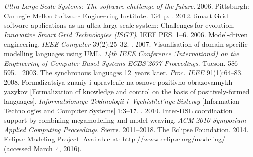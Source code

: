





  \begin{multicols}{2}

\renewcommand{\bibname}{\protect\rmfamily References}

{\small\frenchspacing
 {%
 \begin{thebibliography}{99}
 \textit{Ultra-Large-Scale Systems: The software challenge of the future}. 
 2006. Pittsburgh: 
Carnegie Mellon Software Engineering Institute. 134~p.
. 2012. Smart Grid software applications as an 
ultra-large-scale system: Challenges for evolution. \textit{Innovative Smart Grid Technologies 
(ISGT)}. IEEE PES.  1--6.
 2006.  Model-driven engineering. \textit{IEEE Computer} 39(2):25--32.
. 2007. Visualisation of domain-specific modelling languages 
using UML. \textit{14th IEEE  Conference (International) on the Engineering of Computer-Based 
Systems ECBS'2007 Proceedings}. Tucson. 586--595.
. 2003. The synchronous languages 12~years later. \textit{Proc. IEEE}  91(1):64--83.
 2008. Formalizatsiya znaniy i upravlenie na osnove pozitivno-obrazovannykh 
yazykov [Formalization of knowledge and control on the basis of positively-formed languages]. 
\textit{Informatsionnye Tekhnologii i~Vychislitel'nye Sistemy} [Information Technologies and 
Computer Systems] 1:3--17.
. 2010.  
Inter-DSL coordination support by combining megamodeling and model weaving. \textit{ACM 
2010 Symposium Applied Computing Proceedings}. Sierre.  2011--2018.
The Eclipse Foundation. 2014. Eclipse Modeling Project.  Available at: {\sf 
http://www.eclipse.org/modeling/} (accessed March~4, 2016).

\end{thebibliography}}}
\end{multicols}
